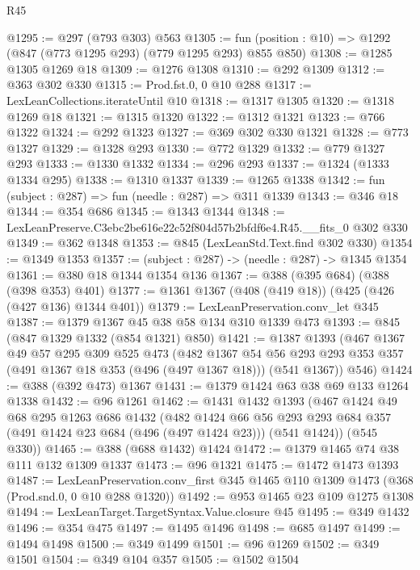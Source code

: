 \begin{lexlean}{R45}
\begin{coremodule}
@1295 := @297 (@793 @303) @563
@1305 := fun (position : @10) => @1292 (@847 (@773 @1295 @293) (@779 @1295 @293) @855 @850)
@1308 := @1285 @1305 @1269 @18
@1309 := @1276 @1308
@1310 := @292 @1309
@1312 := @363 @302 @330
@1315 := Prod.fst.{0, 0} @10 @288
@1317 := LexLeanCollections.iterateUntil @10
@1318 := @1317 @1305
@1320 := @1318 @1269 @18
@1321 := @1315 @1320
@1322 := @1312 @1321
@1323 := @766 @1322
@1324 := @292 @1323
@1327 := @369 @302 @330 @1321
@1328 := @773 @1327
@1329 := @1328 @293
@1330 := @772 @1329
@1332 := @779 @1327 @293
@1333 := @1330 @1332
@1334 := @296 @293
@1337 := @1324 (@1333 @1334 @295)
@1338 := @1310 @1337
@1339 := @1265 @1338
@1342 := fun (subject : @287) => fun (needle : @287) => @311 @1339
@1343 := @346 @18
@1344 := @354 @686
@1345 := @1343 @1344
@1348 := LexLeanPreserve.C3ebc2be616e22c52f804d57b2bfdf6e4.R45.__fits_0 @302 @330
@1349 := @362 @1348
@1353 := @845 (LexLeanStd.Text.find @302 @330)
@1354 := @1349 @1353
@1357 := (subject : @287) -> (needle : @287) -> @1345 @1354
@1361 := @380 @18 @1344 @1354 @136
@1367 := @388 (@395 @684) (@388 (@398 @353) @401)
@1377 := @1361 @1367 (@408 (@419 @18)) (@425 (@426 (@427 @136) @1344 @401))
@1379 := LexLeanPreservation.conv_let @345
@1387 := @1379 @1367 @45 @38 @58 @134 @310 @1339 @473
@1393 := @845 (@847 @1329 @1332 (@854 @1321) @850)
@1421 := @1387
    @1393
    (@467
      @1367
      @49
      @57
      @295
      @309
      @525
      @473
      (@482
        @1367
        @54
        @56
        @293
        @293
        @353
        @357
        (@491 @1367 @18 @353 (@496 (@497 @1367 @18)))
        (@541 @1367))
      @546)
@1424 := @388 (@392 @473) @1367
@1431 := @1379 @1424 @63 @38 @69 @133 @1264 @1338
@1432 := @96 @1261
@1462 := @1431
    @1432
    @1393
    (@467
      @1424
      @49
      @68
      @295
      @1263
      @686
      @1432
      (@482
        @1424
        @66
        @56
        @293
        @293
        @684
        @357
        (@491 @1424 @23 @684 (@496 (@497 @1424 @23)))
        (@541 @1424))
      (@545 @330))
@1465 := @388 (@688 @1432) @1424
@1472 := @1379 @1465 @74 @38 @111 @132 @1309 @1337
@1473 := @96 @1321
@1475 := @1472 @1473 @1393
@1487 := LexLeanPreservation.conv_first
    @345
    @1465
    @110
    @1309
    @1473
    (@368 (Prod.snd.{0, 0} @10 @288 @1320))
@1492 := @953 @1465 @23 @109 @1275 @1308
@1494 := LexLeanTarget.TargetSyntax.Value.closure @45
@1495 := @349 @1432
@1496 := @354 @475
@1497 := @1495 @1496
@1498 := @685 @1497
@1499 := @1494 @1498
@1500 := @349 @1499
@1501 := @96 @1269
@1502 := @349 @1501
@1504 := @349 @104 @357
@1505 := @1502 @1504

\end{coremodule}
\end{lexlean}
